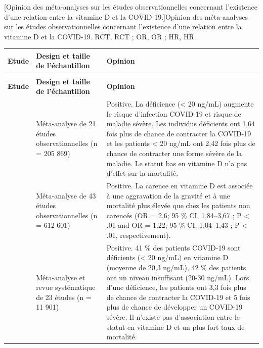 \documentclass[
  a4paper,
  DIV=11,
  numbers=noendperiod,
  listof=totoc]{scrreprt}
\begin{document}
\clearpage
\begin{landscape}
\begin{center}
\captionsetup{font=small, singlelinecheck=false}
[Opinion des méta-analyses sur les études observationnelles concernant l'existence d'une relation entre la vitamine D et la COVID-19.]{Opinion des méta-analyses sur les études observationnelles concernant l'existence d'une relation entre la vitamine D et la COVID-19. \acs{RCT}, \acl{RCT} ; \acs{OR}, \acl{OR} ; \acs{HR}, \acl{HR}.}
\label{tab:meta-analyses}
\small

\begin{tabularx}{\linewidth}{@{}lp{6cm}Y@{}}

\toprule
\textbf{Etude} & \textbf{Design et taille de l'échantillon} & \textbf{Opinion} \\
\midrule
\endfirsthead

\caption[]{(suite)} \\
\toprule
\textbf{Etude} & \textbf{Design et taille de l'échantillon} & \textbf{Opinion} \\
\midrule
\endhead

\bottomrule
\endlastfoot

\textcite{Kaya.2021} & Méta-analyse de 21 études observationnelles (n = 205 869) & Positive. La déficience (< 20 ng/mL) augmente le risque d'infection COVID-19 et risque de maladie sévère. Les individus déficients ont 1,64 fois plus de chance de contracter la COVID-19 et les patients < 20 ng/mL ont 2,42 fois plus de chance de contracter une forme sévère de la maladie. Le statut bas en vitamine D n'a pas d'effet sur la mortalité.\\


\textcite{Petrelli.2021} & Méta-analyse de 43 études observationnelles (n = 612 601) & Positive. La carence en vitamine D est associée à une aggravation de la gravité et à une mortalité plus élevée que chez les patients non carencés (OR = 2,6; 95 \% CI, 1,84–3,67 ; P < .01 and OR = 1.22; 95 \% CI, 1,04–1,43 ; P < .01, respectivement).\\


\textcite{Ghasemian.2021} & Méta-analyse et revue systématique de 23 études (n = 11 901) & Positive. 41 \% des patients COVID-19 sont déficients (< 20 ng/mL) en vitamine D (moyenne de 20,3 ng/mL), 42 \% des patients ont un niveau insuffisant (20-30 ng/mL). Lors d'une déficience, les patients ont 3,3 fois plus de chance de contracter la COVID-19 et 5 fois plus de chance de développer un COVID-19 sévère. Il n'existe pas d'association entre le statut en vitamine D et un plus fort taux de mortalité.\\


\end{tabularx}
\end{center}
\end{landscape}
\end{document}
